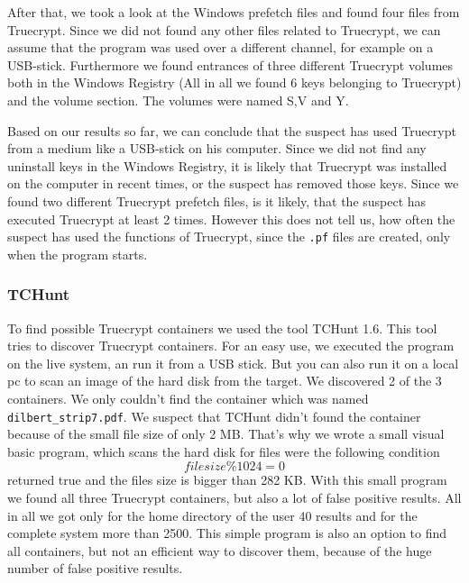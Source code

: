 After that, we took a look at the Windows prefetch files and found four files from Truecrypt. Since we did not found any other files related to Truecrypt, we can assume that the program was used over a different channel, for example on a USB-stick. Furthermore we found entrances of three different Truecrypt volumes both in the  Windows Registry (All in all we found 6 keys belonging to Truecrypt) and the volume section. The volumes were named S,V and Y.

Based on our results so far, we can conclude that the suspect has used Truecrypt from a medium like a USB-stick on his computer. Since we did not find any uninstall keys in the  Windows Registry, it is likely that Truecrypt was installed on the computer in recent times, or the suspect has removed those keys. Since we found two different Truecrypt prefetch files, is it likely, that the suspect has executed Truecrypt at least 2 times. However this does not tell us, how often the suspect has used the functions of Truecrypt, since the \texttt{.pf} files are created, only when the program starts.

\subsubsection{TCHunt}
To find possible Truecrypt containers we used the tool TCHunt 1.6. This tool tries to discover Truecrypt containers. For an easy use, we executed the program on the live system, an run it from a USB stick. But you can also run it on a local pc to scan an image of the hard disk from the target. We discovered 2 of the 3 containers. We only couldn't find the container which was named \texttt{dilbert\_strip7.pdf}. We suspect that TCHunt didn't found the container because of the small file size of only 2 MB. That's why we wrote a small visual basic program, which scans the hard disk for files were the following condition  \[filesize \% 1024 = 0\] returned true and the files size is bigger than 282 KB. With this small program we found all three Truecrypt containers, but also a lot of false positive results. All in all we got only for the home directory of the user 40 results and for the complete system more than 2500. This simple program is also an option to find all containers, but not an efficient way to discover them, because of the huge number of false positive results.  

